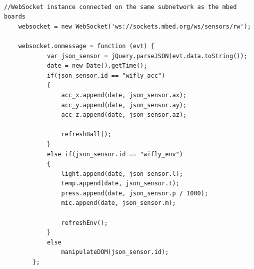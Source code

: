 \documentclass[pdftex,10pt,a4paper]{report}
\newenvironment{packed_item}{
\begin{itemize}
  \setlength{\itemsep}{1pt}
  \setlength{\parskip}{0pt}
  \setlength{\parsep}{0pt}
}{\end{itemize}}
\begin{document}
 \\


\begin{center}
\begin{lstlisting}[label=Manipulation of WebSocket messages by the dashboard,caption=Manipulation of WebSocket messages by the dashboard]
    //WebSocket instance connected on the same subnetwork as the mbed boards
    websocket = new WebSocket('ws://sockets.mbed.org/ws/sensors/rw');

    websocket.onmessage = function (evt) {
			var json_sensor = jQuery.parseJSON(evt.data.toString());
			date = new Date().getTime();
			if(json_sensor.id == "wifly_acc") 
			{
				acc_x.append(date, json_sensor.ax);
				acc_y.append(date, json_sensor.ay);
				acc_z.append(date, json_sensor.az);

				refreshBall();
			}
			else if(json_sensor.id == "wifly_env") 
			{
				light.append(date, json_sensor.l);
				temp.append(date, json_sensor.t);
				press.append(date, json_sensor.p / 1000);
				mic.append(date, json_sensor.m);

				refreshEnv();
			}
			else
				manipulateDOM(json_sensor.id);
		};
	\end{lstlisting}
\end{center}
\end{document}
